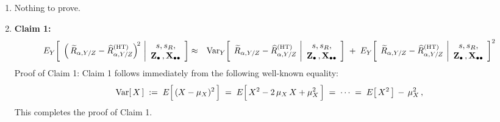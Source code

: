 \begin{enumerate}
\item
    Nothing to prove.
\item
    \textbf{Claim 1:}\quad
    \begin{eqnarray*}
    E_{Y}\!\left[\;\,
        \left(\,\widetilde{R}_{\alpha,Y/Z} - \widehat{R}^{\textnormal{(HT)}}_{\alpha,Y/Z}\right)^{\!2}
        \,\left\vert
        \begin{array}{c}
            s,s_{R},
            \\
            \mathbf{Z}_{\bullet}\,,\mathbf{X}_{\bullet\bullet}
            \end{array}
        \right.
        \!\right]
    & \approx &
        \textnormal{Var}_{Y}\!\left[\;\,
            \widetilde{R}_{\alpha,Y/Z} - \widehat{R}^{\textnormal{(HT)}}_{\alpha,Y/Z}
            \,\left\vert
            \begin{array}{c}
                s,s_{R},
                \\
                \mathbf{Z}_{\bullet}\,,\mathbf{X}_{\bullet\bullet}
                \end{array}
            \right.
            \!\right]
        \; + \;
        E_{Y}\!\left[\;\,
            \widetilde{R}_{\alpha,Y/Z} - \widehat{R}^{\textnormal{(HT)}}_{\alpha,Y/Z}
            \,\left\vert
            \begin{array}{c}
                s,s_{R},
                \\
                \mathbf{Z}_{\bullet}\,,\mathbf{X}_{\bullet\bullet}
                \end{array}
            \right.
            \!\right]^{2}
    \end{eqnarray*}
    \vskip 0.1cm
    \noindent
    Proof of Claim 1:\;\;
    Claim 1 follows immediately from the following well-known equality:
    \begin{equation*}
    \Var[\,X\,]
    \; := \;
        E\!\left[\,\overset{{\color{white}.}}{(X - \mu_{X})^{2}}\,\right]
    \; = \;
        E\!\left[\,\overset{{\color{white}.}}{X^{2} - 2\,\mu_{X}\,X + \mu_{X}^{2}}\,\right]
    \; = \;
        \cdots
    \; = \;
        E\!\left[\,X^{2}\,\right] \,-\, \mu_{X}^{2}\,,
    \end{equation*}
    This completes the proof of Claim 1.


\end{enumerate}
